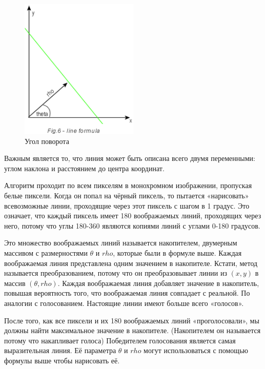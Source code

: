\begin{figure}[ht!]
  \centering
  \includegraphics[width=0.5\textwidth]{inc/raster/design2-5.png}
  \caption{Угол поворота}
  \label{fig:fig25}
\end{figure}

Важным является то, что линия может быть описана всего двумя переменными: углом наклона и расстоянием до центра координат. 

Алгоритм проходит по всем пикселям в монохромном изображении, пропуская белые пиксели. Когда он попал на чёрный пиксель, то пытается «нарисовать» всевозможные линии, проходящие через этот пиксель с шагом в 1 градус. Это означает, что каждый пиксель имеет 180 воображаемых линий, проходящих через него, потому что углы 180-360 являются копиями линий с углами 0-180 градусов. 

Это множество воображаемых линий называется накопителем, двумерным массивом с размерностями $\theta$ и $rho$, которые были в формуле выше. Каждая воображаемая линия представлена одним значением в накопителе. Кстати, метод называется преобразованием, потому что он преобразовывает линии из $(x, y)$ в массив $(\theta, rho)$. Каждая воображаемая линия добавляет значение в накопитель, повышая вероятность того, что воображаемая линия совпадает с реальной. По аналогии с голосованием. Настоящие линии имеют больше всего «голосов». 

После того, как все пиксели и их 180 воображаемых линий «проголосовали», мы должны найти максимальное значение в накопителе. (Накопителем он называется потому что накапливает голоса) Победителем голосования является самая выразительная линия. Её параметра $\theta$ и $rho$ могут использоваться с помощью формулы выше чтобы нарисовать её. 

